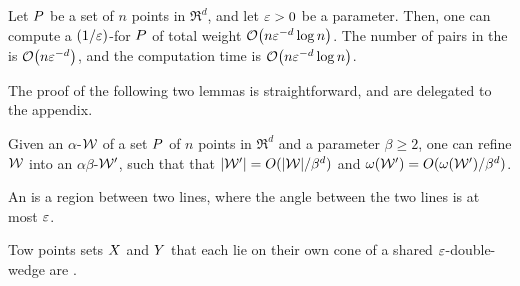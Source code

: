 \documentclass[12pt]{article}%
\begin{document}

\begin{theorem}
    Let $P$ be a set of $n$ points in $\Re^d$, and let $\varepsilon > 0$ be
    a parameter. Then, one can compute a $(1/\varepsilon)$-\SSPD for $P$ of
    total weight $\Of\pth{n \eps^{-d} \log n}$. The number of pairs in
    the \SSPD is $\Of\pth{n \eps^{-d}}$, and the computation time is
    $\Of\pth{ n \eps^{-d} \log n }$.
\end{theorem}

The proof of the following two lemmas is straightforward, and are
delegated to the appendix.

\SaveContent{\LemmaChopEasyBody}%
{%
    Given an $\alpha$-\SSPD $\mathcal{W}$ of a set $P$ of $n$ points in
    $\Re^d$ and a parameter $\beta \geq 2$, one can refine $\mathcal{W}$ into
    an $\alpha\beta$-\SSPD $\mathcal{W}'$, such that that
    $|\mathcal{W}'| = O(|\mathcal{W}|/\beta^d)$ and
    $\WeightX{\WS'} = O(\WeightX{\WS'}/\beta^d)$.
 }
 
\begin{lemma}
    \LemmaChopEasyBody{}
\end{lemma}

\begin{defn}%
    An  is a region between two lines,
    where the angle between the two lines is at most $\varepsilon$.

    Tow points sets $X$ and $Y$ that each lie on their own cone of
    a shared $\varepsilon$-double-wedge are .
\end{defn}

\end{document}
